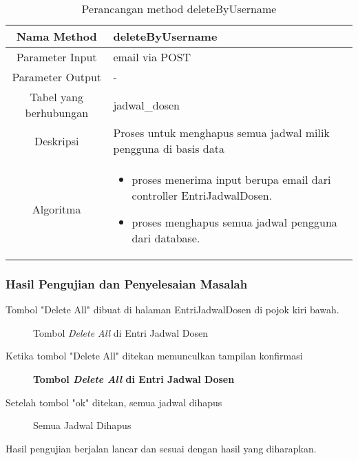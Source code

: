 \begin{center}
\begin{table}[H]
\begin{tabular}{|c|p{11cm}|}
\hline
Nama Method 	& 	deleteByUsername 	\\
\hline
Parameter Input & email via POST \\
\hline
Parameter Output & - \\
\hline
Tabel yang berhubungan & jadwal\_dosen \\
\hline
Deskripsi	& Proses untuk menghapus semua jadwal milik pengguna di basis data\\
\hline
Algoritma	& \begin{itemize}
				\item proses menerima input berupa email dari controller EntriJadwalDosen.
				\item proses menghapus semua jadwal pengguna dari database.
				\end{itemize} \\
\hline
\end{tabular}
\caption{Perancangan method deleteByUsername}
\end{table}
\end{center}

\subsubsection{Hasil Pengujian dan Penyelesaian Masalah}
Tombol "Delete All" dibuat di halaman EntriJadwalDosen di pojok kiri bawah.
\begin{figure} [H]
	\centering  
	\caption[Tombol \textit{Delete All} di Entri Jadwal Dosen]{Tombol \textit{Delete All} di Entri Jadwal Dosen} 
	\label{fig:flow-chart-CodeIgniter} 
\end{figure}
Ketika tombol "Delete All" ditekan memunculkan tampilan konfirmasi
\begin{figure} [H]
	\centering  
	\caption[Tampilan Konfirmasi]{\textbf{Tombol \textit{Delete All} di Entri Jadwal Dosen}} 
	\label{fig:flow-chart-CodeIgniter} 
\end{figure}
Setelah tombol "ok" ditekan, semua jadwal dihapus
\begin{figure} [H]
	\centering  
	\caption[Semua Jadwal Dihapus]{Semua Jadwal Dihapus} 
	\label{fig:flow-chart-CodeIgniter} 
\end{figure}
Hasil pengujian berjalan lancar dan sesuai dengan hasil yang diharapkan.

